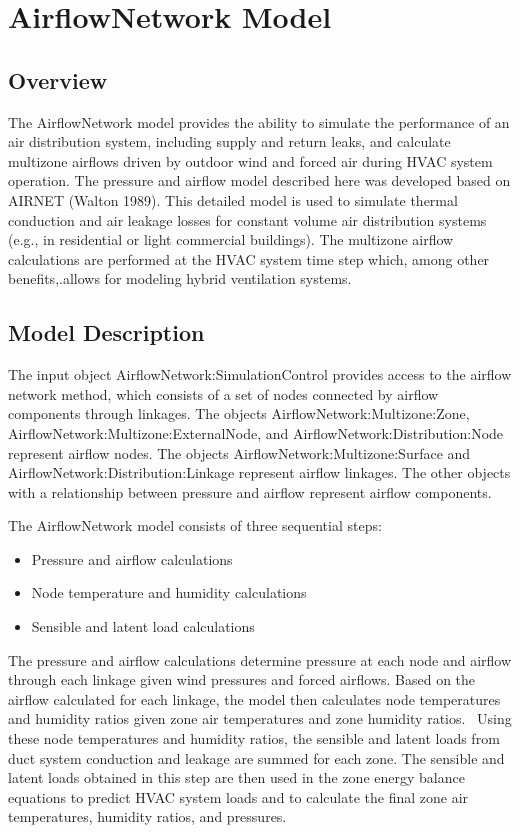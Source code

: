 \section{AirflowNetwork Model}\label{airflownetwork-model}

\subsection{Overview}\label{overview-004}

The AirflowNetwork model provides the ability to simulate the performance of an air distribution system, including supply and return leaks, and calculate multizone airflows driven by outdoor wind and forced air during HVAC system operation. The pressure and airflow model described here was developed based on AIRNET (Walton 1989). This detailed model is used to simulate thermal conduction and air leakage losses for constant volume air distribution systems (e.g., in residential or light commercial buildings). The multizone airflow calculations are performed at the HVAC system time step which, among other benefits,.allows for modeling hybrid ventilation systems.

\subsection{Model Description}\label{model-description-001}

The input object AirflowNetwork:SimulationControl provides access to the airflow network method, which consists of a set of nodes connected by airflow components through linkages. The objects AirflowNetwork:Multizone:Zone, AirflowNetwork:Multizone:ExternalNode, and AirflowNetwork:Distribution:Node represent airflow nodes. The objects AirflowNetwork:Multizone:Surface and AirflowNetwork:Distribution:Linkage represent airflow linkages. The other objects with a relationship between pressure and airflow represent airflow components.

The AirflowNetwork model consists of three sequential steps:

\begin{itemize}
\item
  Pressure and airflow calculations
\item
  Node temperature and humidity calculations
\item
  Sensible and latent load calculations
\end{itemize}

The pressure and airflow calculations determine pressure at each node and airflow through each linkage given wind pressures and forced airflows. Based on the airflow calculated for each linkage, the model then calculates node temperatures and humidity ratios given zone air temperatures and zone humidity ratios.~ Using these node temperatures and humidity ratios, the sensible and latent loads from duct system conduction and leakage are summed for each zone. The sensible and latent loads obtained in this step are then used in the zone energy balance equations to predict HVAC system loads and to calculate the final zone air temperatures, humidity ratios, and pressures.

